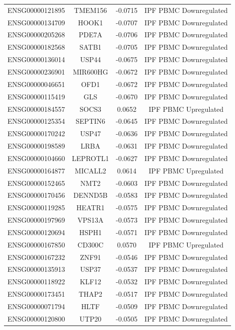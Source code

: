 \documentclass[
]{article}
\begin{document}
\begin{singlespace}
\begin{longtable}[t]{lccc}
ENSG00000121895 & TMEM156 & -0.0715 & IPF PBMC Downregulated\\
ENSG00000134709 & HOOK1 & -0.0707 & IPF PBMC Downregulated\\
ENSG00000205268 & PDE7A & -0.0706 & IPF PBMC Downregulated\\
ENSG00000182568 & SATB1 & -0.0705 & IPF PBMC Downregulated\\
ENSG00000136014 & USP44 & -0.0675 & IPF PBMC Downregulated\\
\addlinespace
ENSG00000236901 & MIR600HG & -0.0672 & IPF PBMC Downregulated\\
ENSG00000046651 & OFD1 & -0.0672 & IPF PBMC Downregulated\\
ENSG00000115419 & GLS & -0.0670 & IPF PBMC Downregulated\\
ENSG00000184557 & SOCS3 & 0.0652 & IPF PBMC Upregulated\\
ENSG00000125354 & SEPTIN6 & -0.0645 & IPF PBMC Downregulated\\
\addlinespace
ENSG00000170242 & USP47 & -0.0636 & IPF PBMC Downregulated\\
ENSG00000198589 & LRBA & -0.0631 & IPF PBMC Downregulated\\
ENSG00000104660 & LEPROTL1 & -0.0627 & IPF PBMC Downregulated\\
ENSG00000164877 & MICALL2 & 0.0614 & IPF PBMC Upregulated\\
ENSG00000152465 & NMT2 & -0.0603 & IPF PBMC Downregulated\\
\addlinespace
ENSG00000170456 & DENND5B & -0.0583 & IPF PBMC Downregulated\\
ENSG00000119285 & HEATR1 & -0.0575 & IPF PBMC Downregulated\\
ENSG00000197969 & VPS13A & -0.0573 & IPF PBMC Downregulated\\
ENSG00000120694 & HSPH1 & -0.0571 & IPF PBMC Downregulated\\
ENSG00000167850 & CD300C & 0.0570 & IPF PBMC Upregulated\\
\addlinespace
ENSG00000167232 & ZNF91 & -0.0546 & IPF PBMC Downregulated\\
ENSG00000135913 & USP37 & -0.0537 & IPF PBMC Downregulated\\
ENSG00000118922 & KLF12 & -0.0532 & IPF PBMC Downregulated\\
ENSG00000173451 & THAP2 & -0.0517 & IPF PBMC Downregulated\\
ENSG00000071794 & HLTF & -0.0509 & IPF PBMC Downregulated\\
\addlinespace
ENSG00000120800 & UTP20 & -0.0505 & IPF PBMC Downregulated\\

\end{longtable}
\end{singlespace}
\end{document}
